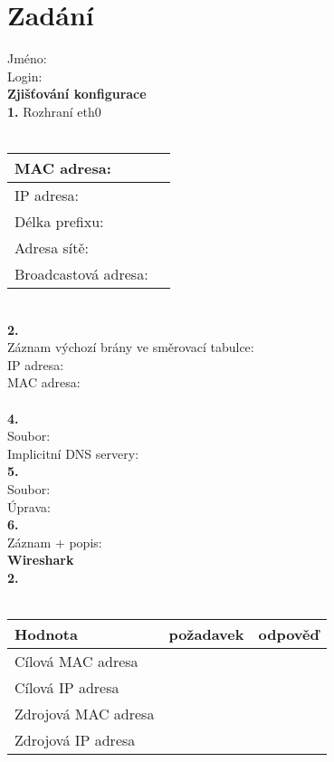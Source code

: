 \section{Zadání}
Jméno:\\
Login:\\

\textbf{Zjišťování konfigurace}\\
\textbf{1.} Rozhraní eth0\\
\\
\begin{tabular}{|l|r|}
\hline
MAC adresa: & \hspace{12em} \\
\hline
IP adresa: & \hspace{12em} \\
\hline
Délka prefixu: & \\
\hline
Adresa sítě: & \\
\hline
Broadcastová adresa: & \\
\hline
\end{tabular}
\vspace{1.5em}
\\
\textbf{2.}\\
\vspace{3em}
Záznam výchozí brány ve směrovací tabulce:\\
IP adresa:\\
MAC adresa:\\
\\
\textbf{4.}\\
Soubor:\\
\vspace{8em}
Implicitní DNS servery:\\
\textbf{5.}\\
Soubor:\\
\vspace{4em}
Úprava:\\
\newpage
\noindent
\textbf{6.}\\
\vspace{5em}
Záznam + popis:\\
\noindent
\textbf{Wireshark}\\
\textbf{2.}\\
\\
\begin{tabular}{|l|c|c|}
\hline
\textbf{Hodnota} & \textbf{požadavek} & \textbf{odpověď}\\
\hline
Cílová MAC adresa & \hspace{10em} & \hspace{10em} \\
\hline
Cílová IP adresa & & \\
\hline
Zdrojová MAC adresa & & \\
\hline
Zdrojová IP adresa & & \\
\hline
\end{tabular}
